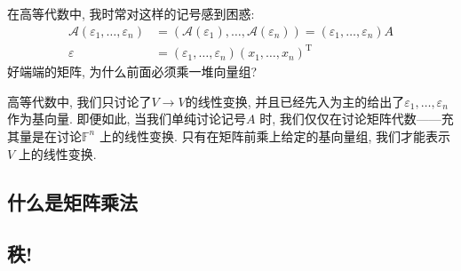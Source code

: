 在高等代数中, 我时常对这样的记号感到困惑:
\begin{align*}
    \mathscr{A}(\varepsilon_{1}, \dots, \varepsilon_{n}) &=
    (\mathscr{A}(\varepsilon_{1}), \dots,
    \mathscr{A}(\varepsilon_{n})) = (\varepsilon_{1},
    \dots, \varepsilon_{n})A\\
    \varepsilon &= (\varepsilon_{1}, \dots, \varepsilon_{n})
    (x_{1}, \dots,   x_{n})^{\mathrm{T}}
\end{align*}
好端端的矩阵, 为什么前面必须乘一堆向量组?

高等代数中, 我们只讨论了\(V \to V\)的线性变换,
并且已经先入为主的给出了\(\varepsilon_{1}, \dots, \varepsilon_{n}\) 作为基向量.
即便如此, 当我们单纯讨论记号\(A\) 时,
我们仅仅在讨论矩阵代数——充其量是在讨论\(\mathbb{F}^{n}\) 上的线性变换.
只有在矩阵前乘上给定的基向量组, 我们才能表示\(V\) 上的线性变换.

\subsection{什么是矩阵乘法}
\subsection{秩!}

